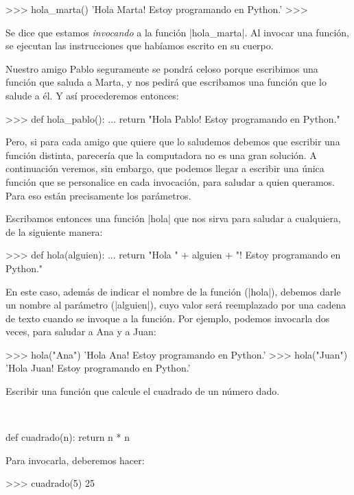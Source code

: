 \begin{codigo-python-sn}
>>> hola_marta()
'Hola Marta! Estoy programando en Python.'
>>>
\end{codigo-python-sn}

Se dice que estamos \emph{invocando} a la función |hola_marta|.  Al invocar una
función, se ejecutan las instrucciones que habíamos escrito en su cuerpo.

Nuestro amigo Pablo seguramente se pondrá celoso porque escribimos
una función que saluda a Marta, y nos pedirá que escribamos una
función que lo salude a él. Y así procederemos entonces:

\begin{codigo-python-sn}
>>> def hola_pablo():
...     return "Hola Pablo! Estoy programando en Python."
\end{codigo-python-sn}

Pero, si para cada amigo que quiere que lo saludemos debemos que
escribir una función distinta, parecería que la computadora no es
una gran solución. A continuación veremos, sin embargo, que
podemos llegar a escribir una única función que se personalice en
cada invocación, para saludar a quien queramos. Para eso están
precisamente los parámetros.

Escribamos entonces una función |hola| que nos sirva para saludar a
cualquiera, de la siguiente manera:

\begin{codigo-python-sn}
>>> def hola(alguien):
...     return "Hola " + alguien + "! Estoy programando en Python."
\end{codigo-python-sn}

En este caso, además de indicar el nombre de la función (|hola|), debemos darle
un nombre al parámetro (|alguien|), cuyo valor será reemplazado por una cadena
de texto cuando se invoque a la función. Por ejemplo, podemos invocarla dos
veces, para saludar a Ana y a Juan:

\begin{codigo-python-sn}
>>> hola("Ana")
'Hola Ana! Estoy programando en Python.'
>>> hola("Juan")
'Hola Juan! Estoy programando en Python.'
\end{codigo-python-sn}

\begin{problema}
\label{cuadrado}
Escribir una función que calcule el cuadrado de un número dado.
\end{problema}

\begin{solucion}
$ $\par
\begin{codigo-python-sn}
def cuadrado(n):
    return n * n
\end{codigo-python-sn}

Para invocarla, deberemos hacer:
\begin{codigo-python-sn}
>>> cuadrado(5)
25
\end{codigo-python-sn}
\end{solucion}

